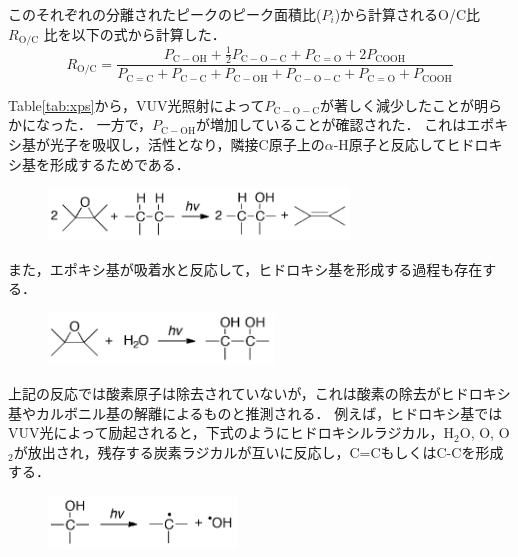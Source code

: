\documentclass[platex,dvipdfmx]{jlreq}			%
\begin{document}
このそれぞれの分離されたピークのピーク面積比($P_i$)から計算されるO/C比 $R_{\mathrm{O/C}}$ 比を以下の式から計算した．
\begin{displaymath}
    R_{\mathrm{O/C}} = \frac{P_{\mathrm{C-OH}} + \frac{1}{2}P_{\mathrm{C-O-C}} + P_{\mathrm{C=O}} + 2P_{\mathrm{COOH}}}{P_{\mathrm{C=C}} + P_{\mathrm{C-C}} + P_{\mathrm{C-OH}} + P_{\mathrm{C-O-C}} + P_{\mathrm{C=O}} + P_{\mathrm{COOH}}}
\end{displaymath}

Table\ref{tab:xps}から，VUV光照射によって$P_{\mathrm{C-O-C}}$が著しく減少したことが明らかになった．
一方で，$P_{\mathrm{C-OH}}$が増加していることが確認された．
これはエポキシ基が光子を吸収し，活性となり，隣接C原子上の$\alpha$-H原子と反応してヒドロキシ基を形成するためである\supercite{kim_room-temperature_2012, koinuma_photochemical_2012}．

\begin{figure}[H]
    \centering
    \includegraphics[width=80mm]{figures/fig_equation1.png}
    \label{fig:equation1}
\end{figure}

また，エポキシ基が吸着水と反応して，ヒドロキシ基を形成する過程も存在する．

\begin{figure}[H]
    \centering
    \includegraphics[width=60mm]{figures/fig_equation2.png}
    \label{fig:equation2}
\end{figure}

上記の反応では酸素原子は除去されていないが，これは酸素の除去がヒドロキシ基やカルボニル基の解離によるものと推測される．
例えば，ヒドロキシ基ではVUV光によって励起されると，下式のようにヒドロキシルラジカル，H$_2$O, O, O$_2$が放出され，残存する炭素ラジカルが互いに反応し，C=CもしくはC-Cを形成する\supercite{smirnov_photochemical_2013}．

\begin{figure}[H]
    \centering
    \includegraphics[width=50mm]{figures/fig_equation3.png}
    \label{fig:equation3}
\end{figure}
\end{document}
